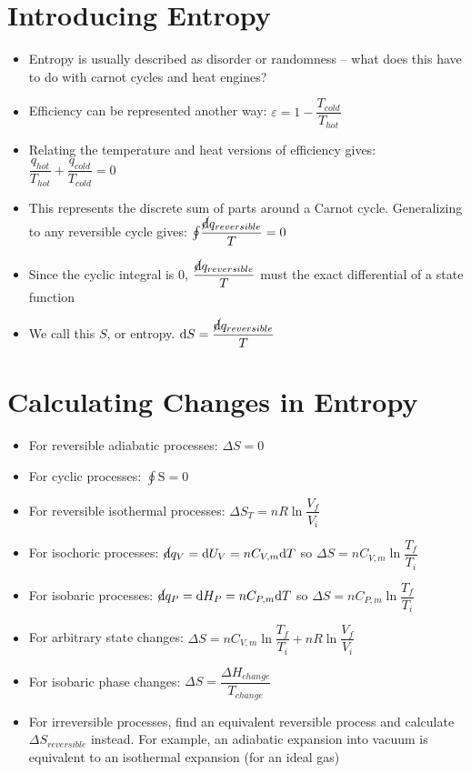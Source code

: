 \documentclass[12pt, openany, letterpaper]{memoir}
\begin{document}
\section*{Introducing Entropy}
\begin{itemize}
	\item Entropy is usually described as disorder or randomness -- what does this have to do with carnot cycles and heat engines?
	\item Efficiency can be represented another way: $\varepsilon = 1-\dfrac{T_{cold}}{T_{hot}}$
	\item Relating the temperature and heat versions of efficiency gives: $\dfrac{q_{hot}}{T_{hot}} + \dfrac{q_{cold}}{T_{cold}}=0$
	\item This represents the discrete sum of parts around a Carnot cycle. Generalizing to any reversible cycle gives: $\oint\!\dfrac{\cancel{\mathrm{d}}q_{reversible}}{T}=0$
	\item Since the cyclic integral is $0$, $\dfrac{\cancel{\mathrm{d}}q_{reversible}}{T}$ must the exact differential of a state function
	\item We call this $S$, or entropy. $\mathrm{d}S = \dfrac{\cancel{\mathrm{d}}q_{reversible}}{T}$
\end{itemize}
\section*{Calculating Changes in Entropy}
\begin{itemize}
	\item For reversible adiabatic processes: $\Delta S = 0$
	\item For cyclic processes: $\oint \mathrm{S} = 0$
	\item For reversible isothermal processes: $\Delta S_T = nR\ln\dfrac{V_f}{V_i}$
	\item For isochoric processes: $\cancel{\mathrm{d}}q_V=\mathrm{d} U_V = nC_{V,m}\mathrm{d}T$ so $\Delta S = nC_{V,m}\ln\dfrac{T_f}{T_i}$
	\item For isobaric processes: $\cancel{\mathrm{d}}q_P=\mathrm{d} H_P = nC_{P,m}\mathrm{d}T$ so $\Delta S = nC_{P,m}\ln\dfrac{T_f}{T_i}$
	\item For arbitrary state changes: $\Delta S = nC_{V,m}\ln\dfrac{T_f}{T_i} + nR\ln\dfrac{V_f}{V_i}$
	\item For isobaric phase changes: $\Delta S = \dfrac{\Delta H_{change}}{T_{change}}$
	\item For irreversible processes, find an equivalent reversible process and calculate $\Delta S_{reversible}$ instead. For example, an adiabatic expansion into vacuum is equivalent to an isothermal expansion (for an ideal gas)
\end{itemize}
\end{document}
